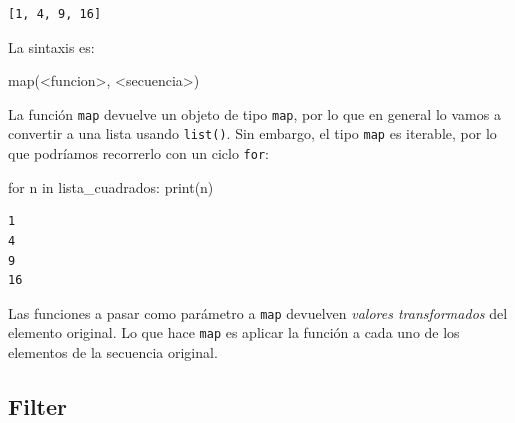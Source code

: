 \documentclass[
  letterpaper,
  DIV=11,
  numbers=noendperiod]{scrreprt}
\newenvironment{Shaded}{\begin{snugshade}}{\end{snugshade}}
\newcommand{\BuiltInTok}[1]{\textcolor[rgb]{0.00,0.23,0.31}{#1}}
\newcommand{\ControlFlowTok}[1]{\textcolor[rgb]{0.00,0.23,0.31}{#1}}
\newcommand{\KeywordTok}[1]{\textcolor[rgb]{0.00,0.23,0.31}{#1}}
\newcommand{\NormalTok}[1]{\textcolor[rgb]{0.00,0.23,0.31}{#1}}
\newcommand{\OperatorTok}[1]{\textcolor[rgb]{0.37,0.37,0.37}{#1}}
\begin{document}
\begin{verbatim}
[1, 4, 9, 16]
\end{verbatim}

La sintaxis es:

\begin{Shaded}
\begin{Highlighting}[]
\BuiltInTok{map}\NormalTok{(}\OperatorTok{\textless{}}\NormalTok{funcion}\OperatorTok{\textgreater{}}\NormalTok{, }\OperatorTok{\textless{}}\NormalTok{secuencia}\OperatorTok{\textgreater{}}\NormalTok{)}
\end{Highlighting}
\end{Shaded}

La función \texttt{map} devuelve un objeto de tipo \texttt{map}, por lo
que en general lo vamos a convertir a una lista usando \texttt{list()}.
Sin embargo, el tipo \texttt{map} es iterable, por lo que podríamos
recorrerlo con un ciclo \texttt{for}:

\begin{Shaded}
\begin{Highlighting}[]
\ControlFlowTok{for}\NormalTok{ n }\KeywordTok{in}\NormalTok{ lista\_cuadrados:}
  \BuiltInTok{print}\NormalTok{(n)}
\end{Highlighting}
\end{Shaded}

\begin{verbatim}
1
4
9
16
\end{verbatim}

\begin{tcolorbox}[enhanced jigsaw, colframe=quarto-callout-tip-color-frame, opacityback=0, opacitybacktitle=0.6, bottomrule=.15mm, toprule=.15mm, coltitle=black, breakable, colback=white, leftrule=.75mm, titlerule=0mm, bottomtitle=1mm, toptitle=1mm, rightrule=.15mm, title=\textcolor{quarto-callout-tip-color}{\faLightbulb}\hspace{0.5em}{Tip}, arc=.35mm, left=2mm, colbacktitle=quarto-callout-tip-color!10!white]

Las funciones a pasar como parámetro a \texttt{map} devuelven
\emph{valores transformados} del elemento original. Lo que hace
\texttt{map} es aplicar la función a cada uno de los elementos de la
secuencia original.

\end{tcolorbox}

\hypertarget{filter}{%
\subsection{Filter}\label{filter}}
\end{document}

